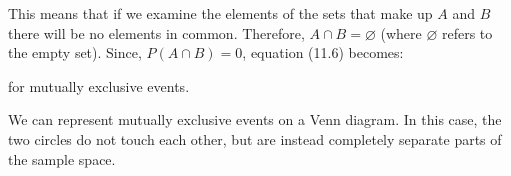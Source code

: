       \label{m39377*id114782}This means that if we examine the elements of the sets
that make up \begin{math}A\end{math} and \begin{math}B\end{math} there will be no elements in common.
Therefore, \begin{math}A\cap B=\varnothing \end{math} (where \begin{math}\varnothing \end{math} refers to the empty set). Since,
\begin{math}P\left(A\cap B\right)=0\end{math},
equation (11.6) becomes:\par 
      \label{m39377*id114861}\nopagebreak\noindent{}
    
      
      \label{m39377*id114906}for mutually exclusive events.\par 
\label{m39377*eip-366}We can represent mutually exclusive events on a Venn diagram. In this case, the two circles do not touch each other, but are instead completely separate parts of the sample space.

